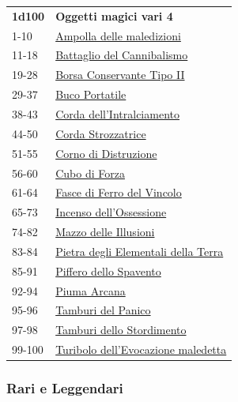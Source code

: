 \begin{multicols}{2}
{{\small\begin{tabularx}{0.45\textwidth}{lX}
\textbf{1d100} & \textbf{Oggetti magici vari 4}\\
1-10 & \hyperlink{Ampolladellemaledizioni}{Ampolla delle maledizioni}\\
11-18 & \hyperlink{BattagliodelCannibalismo}{Battaglio del Cannibalismo}\\
19-28 & \hyperlink{BorsaConservanteTipoII}{Borsa Conservante Tipo II}\\
29-37 & \hyperlink{BucoPortatile}{Buco Portatile}\\
38-43 & \hyperlink{Cordadell'Intralciamento}{Corda dell'Intralciamento}\\
44-50 & \hyperlink{CordaStrozzatrice}{Corda Strozzatrice}\\
51-55 & \hyperlink{CornodiDistruzione}{Corno di Distruzione}\\
56-60 & \hyperlink{CubodiForza}{Cubo di Forza}\\
61-64 & \hyperlink{FascediFerrodelVincolo}{Fasce di Ferro del Vincolo}\\
65-73 & \hyperlink{Incensodell'Ossessione}{Incenso dell'Ossessione}\\
74-82 & \hyperlink{MazzodelleIllusioni}{Mazzo delle Illusioni}\\
83-84 & \hyperlink{PietradegliElementalidellaTerra}{Pietra degli Elementali della Terra}\\
85-91 & \hyperlink{PifferodelloSpavento}{Piffero dello Spavento}\\
92-94 & \hyperlink{PiumaArcana}{Piuma Arcana}\\
95-96 & \hyperlink{TamburidelPanico}{Tamburi del Panico}\\
97-98 & \hyperlink{TamburidelloStordimento}{Tamburi dello Stordimento}\\
99-100 & \hyperlink{Turibolodell'Evocazionemaledetta}{Turibolo dell'Evocazione maledetta}
\end{tabularx}}




\subsubsection{Rari e Leggendari}\hypertarget{Rari e Leggendari}{}

}
\end{multicols}
